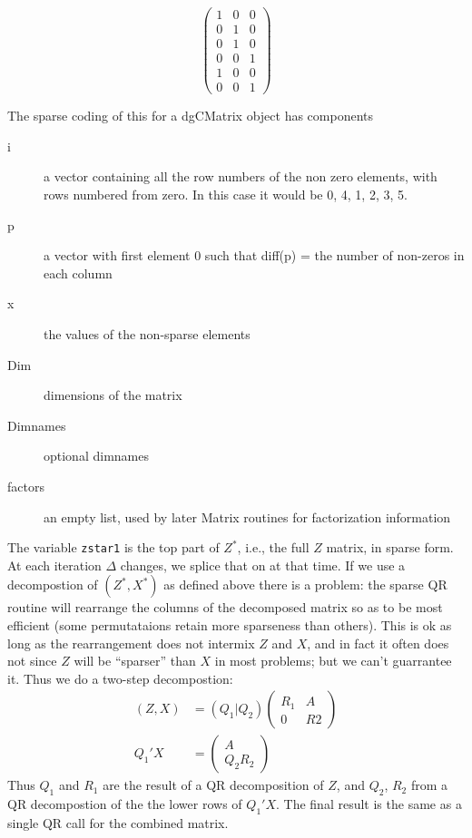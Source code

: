 \documentclass{article}
\begin{document}
\begin{equation*}
  \left( \begin{array}{cccccc}
    1&0&0 \\ 0&1&0 \\ 0&1&0 \\
    0&0&1 \\ 1&0&0 \\0&0&1 \end{array} \right)
\end{equation*}

The sparse coding of this for a dgCMatrix object has 
components
\begin{description}
  \item[i] a vector containing all the row numbers of the non zero
    elements, with rows numbered from zero.
    In this case it would be 0, 4, 1, 2, 3, 5.
  \item[p] a vector with first element 0 such that diff(p) = the
    number of non-zeros in each column
  \item[x] the values of the non-sparse elements
  \item[Dim] dimensions of the matrix
  \item[Dimnames] optional dimnames
  \item[factors] an empty list, used by later Matrix routines for
    factorization information
\end{description}

The variable \Verb!zstar1! is the top part of $Z^*$, i.e., the full $Z$
matrix, in sparse form.  
At each iteration $\Delta$ changes, we splice that on at that time.
If we use a decompostion of $(Z^*, X^*)$ as defined above there
is a problem: the sparse QR routine will rearrange the columns of
the decomposed matrix so as to be most efficient (some permutataions
retain more sparseness than others). 
This is ok as long as the rearrangement does not intermix $Z$ and
$X$, and in fact it often does not since $Z$ will be ``sparser'' than $X$ 
in most problems; but we can't guarrantee it.                  %
Thus we do a two-step decompostion:
\begin{align*}
  (Z,X) &= (Q_1 | Q_2) \left(\begin{array}{cc} R_1 & A\\ 0 & R2 
                       \end{array} \right) \\
    Q_1'X &= \left ( \begin{array}{c} A\\ Q_2R_2 \end{array} \right)
\end{align*}
Thus $Q_1$ and $R_1$ are the result of a QR decomposition of $Z$,
and $Q_2$, $R_2$ from a QR decompostion of the
the lower rows of $Q_1'X$.
The final result is the same as a single QR call for the combined
matrix.
\end{document}

